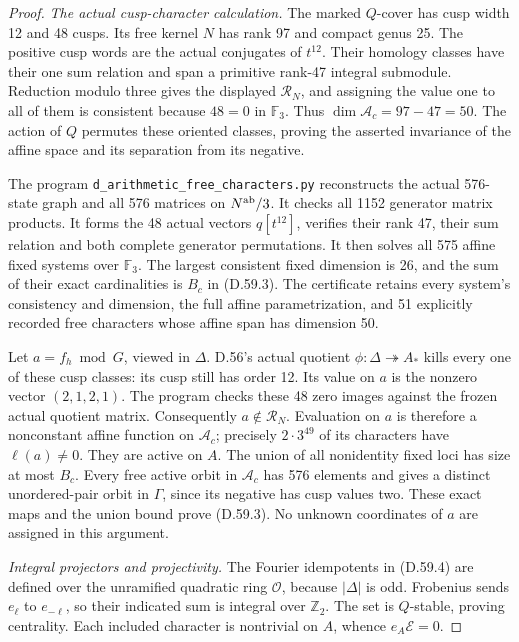 \begin{proof}
\emph{The actual cusp-character calculation.}
The marked \(Q\)-cover has cusp width 12 and
48 cusps. Its free kernel \(N\) has rank 97
and compact genus 25. The positive cusp words
are the actual conjugates of \(t^{12}\).
Their homology classes have their one sum
relation and span a primitive rank-47 integral
submodule. Reduction modulo three gives the
displayed \(\mathcal R_N\), and assigning the
value one to all of them is consistent because
\(48=0\) in \(\mathbb F_3\). Thus
\(\dim\mathscr A_c=97-47=50\). The action of
\(Q\) permutes these oriented classes, proving
the asserted invariance of the affine space
and its separation from its negative.

The program \texttt{d\_arithmetic\_free\_characters.py}
reconstructs the actual 576-state graph and
all 576 matrices on \(N^{\rm ab}/3\). It checks
all 1152 generator matrix products. It forms
the 48 actual vectors \(q[t^{12}]\), verifies
their rank 47, their sum relation and both
complete generator permutations. It then
solves all 575 affine fixed systems over
\(\mathbb F_3\). The largest consistent fixed
dimension is 26, and the sum of their exact
cardinalities is \(B_c\) in (D.59.3). The
certificate retains every system's consistency
and dimension, the full affine parametrization,
and 51 explicitly recorded free characters
whose affine span has dimension 50.

Let \(a=f_h\bmod G\), viewed in \(\Delta\).
D.56's actual quotient
\(\phi:\Delta\twoheadrightarrow A_*\) kills
every one of these cusp classes: its cusp
still has order 12. Its value on \(a\) is
the nonzero vector \((2,1,2,1)\).
The program checks these 48 zero images
against the frozen actual quotient matrix.
Consequently \(a\notin\mathcal R_N\).
Evaluation on \(a\) is therefore a nonconstant
affine function on \(\mathscr A_c\); precisely
\(2\cdot3^{49}\) of its characters have
\(\ell(a)\ne0\). They are active on \(A\).
The union of all nonidentity fixed loci has
size at most \(B_c\). Every free active orbit
in \(\mathscr A_c\) has 576 elements and
gives a distinct unordered-pair orbit in
\(\Gamma\), since its negative has cusp
values two. These exact maps and the
union bound prove (D.59.3). No unknown
coordinates of \(a\) are assigned in this
argument.

\emph{Integral projectors and projectivity.}
The Fourier idempotents in (D.59.4) are defined
over the unramified quadratic ring \(\mathcal O\),
because \(|\Delta|\) is odd. Frobenius sends
\(e_\ell\) to \(e_{-\ell}\), so their indicated
sum is integral over \(\mathbb Z_2\).
The set is \(Q\)-stable, proving centrality.
Each included character is nontrivial on
\(A\), whence \(e_A\mathscr E=0\).


\end{proof}

